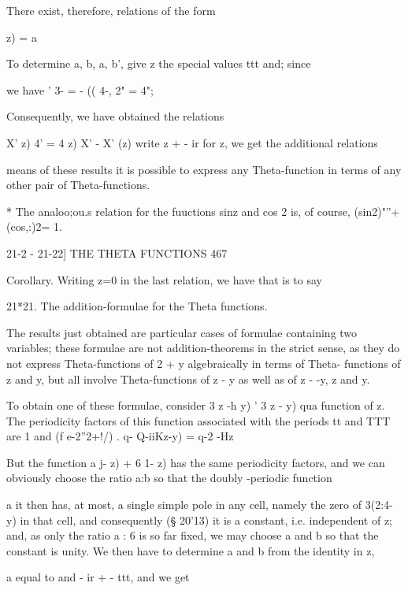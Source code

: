 There exist, therefore, relations of the form

     z) = a%

To determine a, b, a, b', give z the special values ttt and; since

we have ' 3- = - (( 4-, 2" = 4"; %

Consequently, we have obtained the relations

X' z) 4' = 4 z) X' - X' (z) %
write z + - ir for z, we get the additional relations

means of these results it is possible to express any Theta-function in
terms of any other pair of Theta-functions.

* The analoo;ou.s relation for the fuuctions sinz and cos 2 is, of
course, (sin2)"''+(cos,:)2= 1.

21-2 - 21-22] THE THETA FUNCTIONS 467

Corollary. Writing z=0 in the last relation, we have that is to say

21*21. The addition-formulae for the Theta functions.

The results just obtained are particular cases of formulae containing
two variables; these formulae are not addition-theorems in the strict
sense, as they do not express Theta-functions of 2 + y algebraically
in terms of Theta- functions of z and y, but all involve
Theta-functions of z - y as well as of z - -y, z and y.

To obtain one of these formulae, consider 3 z -h y) ' 3 z - y) qua
function of z. The periodicity factors of this function associated
with the periods tt and TTT are 1 and (f e-2''2+!/) . q- Q-iiKz-y) =
q-2 -Hz

But the function a j- z) + 6 1- z) has the same periodicity factors,
and we can obviously choose the ratio a:b so that the doubly -periodic
function

a%
it then has, at most, a single simple pole in any cell, namely the
zero of 3(2:4- y) in that cell, and consequently (§ 20'13) it is a
constant, i.e. independent of z; and, as only the ratio a : 6 is so
far fixed, we may choose a and b so that the constant is unity. We
then have to determine a and b from the identity in z,

a%
equal to and - ir + - ttt, and we get

